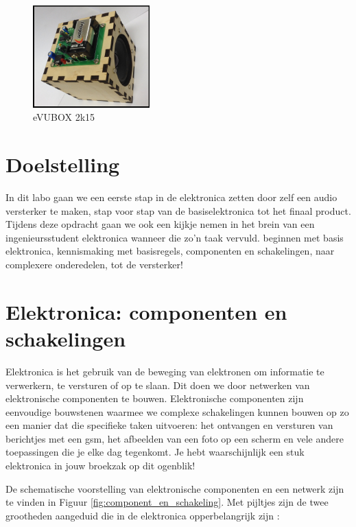 \documentclass{article}
\begin{document}
\maketitle
\begin{figure}[htbp]
	\centering
	\includegraphics[width=0.4\textwidth]{foto}
	\caption{ eVUBOX 2k15}
	\label{fig:foto}
\end{figure}
\tableofcontents
\section{Doelstelling}
In dit labo gaan we een eerste stap in de elektronica zetten door zelf een audio versterker te maken, stap voor stap van de basiselektronica tot het finaal product. Tijdens deze opdracht gaan we ook een kijkje nemen in het brein van een ingenieursstudent elektronica wanneer die zo'n taak vervuld. 
beginnen met basis elektronica, kennismaking met basisregels, componenten en schakelingen, naar complexere onderedelen, tot de versterker!

\section{Elektronica: componenten en schakelingen}
Elektronica is het gebruik van de beweging van elektronen om informatie te verwerkern, te versturen of op te slaan. Dit doen we door netwerken van elektronische componenten te bouwen. Elektronische componenten zijn eenvoudige bouwstenen waarmee we complexe schakelingen kunnen bouwen op zo een manier dat die specifieke taken uitvoeren: het ontvangen en versturen van berichtjes met een gsm, het afbeelden van een foto op een scherm en vele andere toepassingen die je elke dag tegenkomt. Je hebt waarschijnlijk een stuk elektronica in jouw broekzak op dit ogenblik!

De schematische voorstelling van elektronische componenten en een netwerk zijn te vinden in Figuur \ref{fig:component_en_schakeling}. Met pijltjes zijn de twee grootheden aangeduid die in de elektronica opperbelangrijk zijn :
\end{document}
